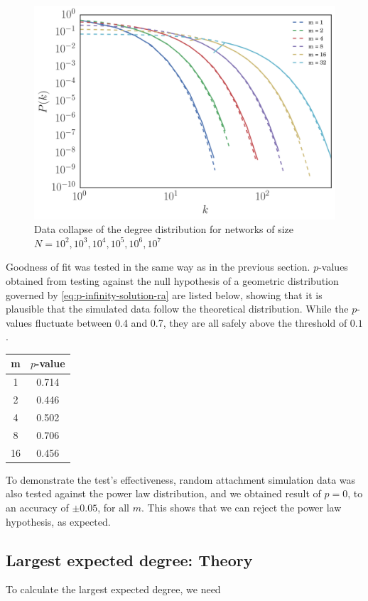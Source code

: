 \begin{figure}
    \centering
    \includegraphics[height=0.5\linewidth]{img/ra-fixed-n-logbin}
    \caption{Data collapse of the degree distribution for networks of size $N=10^2, 10^3, 10^4, 10^5, 10^6, 10^7$}
    \label{fig:ra-fixed-n-logbin}
\end{figure}

Goodness of fit was tested in the same way as in the previous section. $p$-values obtained from testing against the null hypothesis of a geometric distribution governed by \autoref{eq:p-infinity-solution-ra} are listed below, showing that it is plausible that the simulated data follow the theoretical distribution. While the $p$-values fluctuate between 0.4 and 0.7, they are all safely above the threshold of $0.1$. 

\begin{center}
\begin{tabular}{ c | c }
m & $p$-value \\
\hline
1  & 0.714 \\
2  & 0.446 \\
4  & 0.502 \\
8  & 0.706 \\
16 & 0.456 \\
\end{tabular}
\label{table:ra-ks-test}
\end{center}

To demonstrate the test's effectiveness, random attachment simulation data was also tested against the power law distribution, and we obtained result of $p = 0$, to an accuracy of $\pm 0.05$, for all $m$. This shows that we can reject the power law hypothesis, as expected. 

\subsection{Largest expected degree: Theory}\label{subsection:largest-expected-degree}
To calculate the largest expected degree, we need

